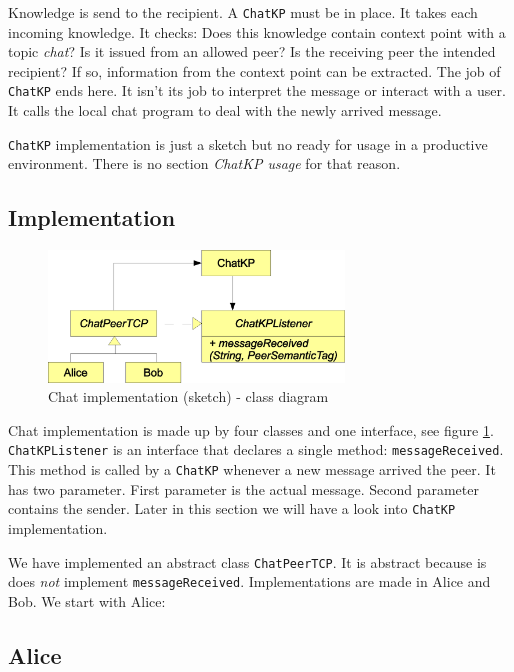 {Knowledge is send to the recipient. A {\tt ChatKP} must be in place. It takes each incoming knowledge. It checks: Does this knowledge contain context point with a topic {\it chat}? Is it issued from an allowed peer? Is the receiving peer the intended recipient? If so, information from the context point can be extracted. The job of {\tt ChatKP} ends here. It isn't its job to interpret the message or interact with a user. It calls the local chat program to deal with the newly arrived message.

{\tt ChatKP} implementation is just a sketch but no ready for usage in a productive environment. There is no section {\it ChatKP usage} for that reason.

\subsection{Implementation}

\begin{figure}[t]
\centering
\includegraphics[width=0.70\textwidth]{chatClassDiagram.eps}
\caption{Chat implementation (sketch) - class diagram}
\label{fig:chatClassDiagram}
\end{figure}

Chat implementation is made up by four classes and one interface, see figure \ref{fig:chatClassDiagram}. {\tt ChatKPListener} is an interface that declares a single method: {\tt messageReceived}. This method is called by a {\tt ChatKP} whenever a new message arrived the peer. It has two parameter. First parameter is the actual message. Second parameter contains the sender. Later in this section we will have a look into {\tt ChatKP} implementation.

We have implemented an abstract class {\tt ChatPeerTCP}. It is abstract because is does {\it not} implement {\tt messageReceived}. Implementations are made in Alice and Bob. We start with Alice:

\subsection{Alice}

}

